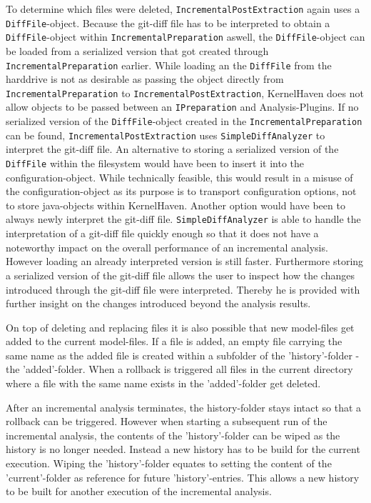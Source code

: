\documentclass[a4paper]{article}
\begin{document}
To determine which files were deleted, \texttt{IncrementalPostExtraction} again uses a \texttt{DiffFile}-object. Because the git-diff file has to be interpreted to obtain a \texttt{DiffFile}-object within \texttt{IncrementalPreparation} aswell, the \texttt{DiffFile}-object can be loaded from a serialized version that got created through \texttt{IncrementalPreparation} earlier. While loading an the \texttt{DiffFile} from the harddrive is not as desirable as passing the object directly from \texttt{IncrementalPreparation} to \texttt{IncrementalPostExtraction}, KernelHaven does not allow objects to be passed between an \texttt{IPreparation} and Analysis-Plugins. If no serialized version of the \texttt{DiffFile}-object created in the \texttt{IncrementalPreparation} can be found, \texttt{IncrementalPostExtraction} uses \texttt{SimpleDiffAnalyzer} to interpret the git-diff file. An alternative to storing a serialized version of the \texttt{DiffFile} within the filesystem would have been to insert it into the configuration-object. While technically feasible, this would result in a misuse of the configuration-object as its purpose is to transport configuration options, not to store java-objects within KernelHaven. Another option would have been to always newly interpret the git-diff file. \texttt{SimpleDiffAnalyzer} is able to handle the interpretation of a git-diff file quickly enough so that it does not have a noteworthy impact on the overall performance of an incremental analysis. However loading an already interpreted version is still faster. Furthermore storing a serialized version of the git-diff file allows the user to inspect how the changes introduced through the git-diff file were interpreted. Thereby he is provided with further insight on the changes introduced beyond the analysis results.
 
 On top of deleting and replacing files it is also possible that new model-files get added to the current model-files. If a file is added, an empty file carrying the same name as the added file is created within a subfolder of the 'history'-folder - the 'added'-folder. When a rollback is triggered all files in the current directory where a file with the same name exists in the 'added'-folder get deleted.
 
After an incremental analysis terminates, the history-folder stays intact so that a rollback can be triggered. 
However when starting a subsequent run of the incremental analysis, the contents of the 'history'-folder can be wiped as the history is no longer needed. Instead a new history has to be build for the current execution. Wiping the 'history'-folder equates to setting the content of the 'current'-folder as reference for future 'history'-entries. This allows a new history to be built for another execution of the incremental analysis.
  
\end{document}
